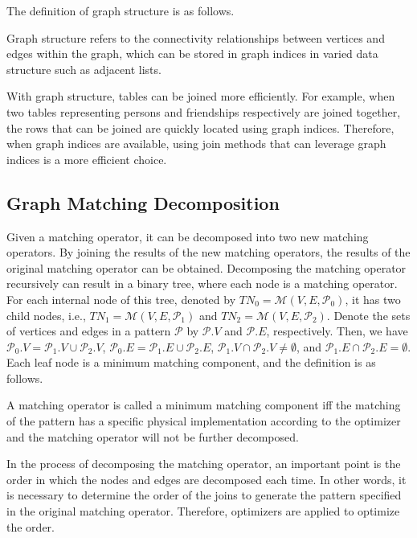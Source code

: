 The definition of graph structure is as follows.

\begin{definition}
    Graph structure refers to the connectivity relationships between vertices and edges within the graph, which can be stored in graph indices in varied data structure such as adjacent lists.
\end{definition}

With graph structure, tables can be joined more efficiently.
For example, when two tables representing persons and friendships respectively are joined together, the rows that can be joined are quickly located using graph indices.
Therefore, when graph indices are available, using join methods that can leverage graph indices is a more efficient choice.

\subsection{Graph Matching Decomposition}

Given a matching operator, it can be decomposed into two new matching operators.
By joining the results of the new matching operators, the results of the original matching operator can be obtained.
Decomposing the matching operator recursively can result in a binary tree, where each node is a matching operator.
For each internal node of this tree, denoted by $TN_0 = \mathcal{M}(V, E, \mathcal{P}_0)$, it has two child nodes, i.e., $TN_1 = \mathcal{M}(V, E, \mathcal{P}_1)$ and $TN_2 = \mathcal{M}(V, E, \mathcal{P}_2)$.
Denote the sets of vertices and edges in a pattern $\mathcal{P}$ by $\mathcal{P}.V$ and $\mathcal{P}.E$, respectively.
Then, we have $\mathcal{P}_0.V = \mathcal{P}_1.V \cup \mathcal{P}_2.V$, $\mathcal{P}_0.E = \mathcal{P}_1.E \cup \mathcal{P}_2.E$, $\mathcal{P}_1.V \cap \mathcal{P}_2.V \neq \emptyset$, and $\mathcal{P}_1.E \cap \mathcal{P}_2.E = \emptyset$.
Each leaf node is a minimum matching component, and the definition is as follows.

\begin{definition}
    A matching operator is called a minimum matching component iff the matching of the pattern has a specific physical implementation according to the optimizer and the matching operator will not be further decomposed.
\end{definition}

In the process of decomposing the matching operator, an important point is the order in which the nodes and edges are decomposed each time.
In other words, it is necessary to determine the order of the joins to generate the pattern specified in the original matching operator.
Therefore, optimizers are applied to optimize the order.


